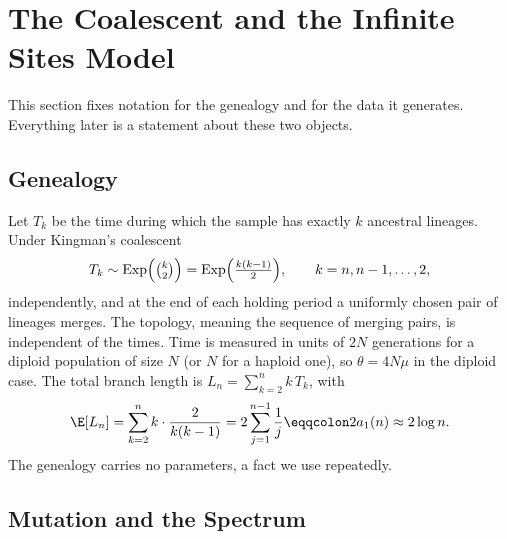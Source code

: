 \section{The Coalescent and the Infinite Sites Model}\label{coal:sec:model}

This section fixes notation for the genealogy and for the data it generates. Everything later is a statement about these two objects.

\subsection{Genealogy}\label{coal:sec:genealogy}

Let $T_k$ be the time during which the sample has exactly $k$ ancestral lineages. Under Kingman's coalescent
\begin{equation}\label{coal:eq:times}
T_k \sim \mathrm{Exp}\Bigl(\tbinom{k}{2}\Bigr) = \mathrm{Exp}\Bigl(\tfrac{k(k-1)}{2}\Bigr), \qquad k=n,n-1,\dots,2,
\end{equation}
independently, and at the end of each holding period a uniformly chosen pair of lineages merges. The topology, meaning the sequence of merging pairs, is independent of the times. Time is measured in units of $2N$ generations for a diploid population of size $N$ (or $N$ for a haploid one), so $\theta=4N\mu$ in the diploid case. The total branch length is $L_n=\sum_{k=2}^n k\,T_k$, with
\begin{equation}\label{coal:eq:EL}
\E[L_n] = \sum_{k=2}^n k\cdot\frac{2}{k(k-1)} = 2\sum_{j=1}^{n-1}\frac{1}{j} \eqqcolon 2a_1(n) \approx 2\log n.
\end{equation}
The genealogy carries no parameters, a fact we use repeatedly.

\subsection{Mutation and the Spectrum}\label{coal:sec:spectrum}

